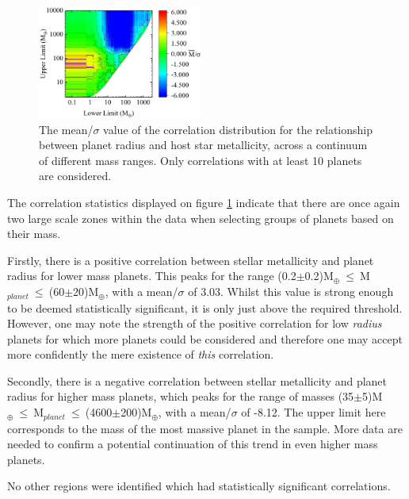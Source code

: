 \documentclass[a4paper,twocolumn,12pt]{article}
\begin{document}
\begin{figure}[h!]
    \centering
    \includegraphics[width=0.48\textwidth]{Graphs/FeH vs Radius correlations - Mass ranges.png}
    \caption{The mean/$\sigma$ value of the correlation distribution for the relationship between planet radius and host star metallicity, across a continuum of different mass ranges. Only correlations with at least 10 planets are considered.}
    \label{figure: Fe/H vs Radius correlations - Mass ranges}
\end{figure}

The correlation statistics displayed on figure \ref{figure: Fe/H vs Radius correlations - Mass ranges} indicate that there are once again two large scale zones within the data when selecting groups of planets based on their mass.

Firstly, there is a positive correlation between stellar metallicity and planet radius for lower mass planets. This peaks for the range (0.2$\pm$0.2)M$_{\oplus}~\leq~$M$_{planet}~\leq~$(60$\pm$20)M$_{\oplus}$, with a mean/$\sigma$ of 3.03. Whilst this value is strong enough to be deemed statistically significant, it is only just above the required threshold. However, one may note the strength of the positive correlation for low \textit{radius} planets for which more planets could be considered and therefore one may accept more confidently the mere existence of \textit{this} correlation.

Secondly, there is a negative correlation between stellar metallicity and planet radius for higher mass planets, which peaks for the range of masses (35$\pm$5)M$_{\oplus}~\leq~$M$_{planet}~\leq~$(4600$\pm$200)M$_{\oplus}$, with a mean/$\sigma$ of -8.12. The upper limit here corresponds to the mass of the most massive planet in the sample. More data are needed to confirm a potential continuation of this trend in even higher mass planets.

No other regions were identified which had statistically significant correlations. 


\end{document}
